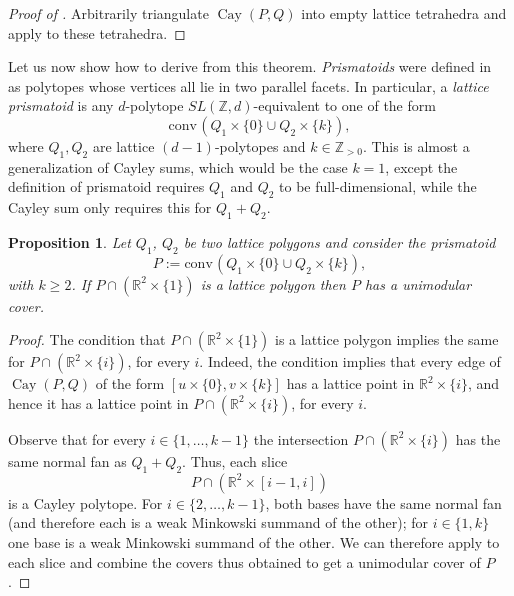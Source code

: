 \documentclass{amsart}
\theoremstyle{plain}
\newtheorem{proposition}[theorem]{Proposition}
\theoremstyle{definition}
\newcommand{\Z}{ \ensuremath{\mathbb{Z}}}
\newcommand{\R}{ \ensuremath{\mathbb{R}}}
\newcommand{\conv}{\ensuremath{\mathrm{conv}}\hspace{1pt}}
\newcommand{\cayley}{\operatorname{Cay}}
\begin{document}
\begin{proof}[Proof of ]
Arbitrarily triangulate $\cayley(P,Q)$ into empty lattice tetrahedra and apply  to these tetrahedra.
\end{proof}

Let us now show how to derive  from this theorem.
\emph{Prismatoids} were defined in~\cite{Santos-hirsch} as polytopes whose vertices all lie in two parallel facets. In particular, a \emph{lattice prismatoid} is any $d$-polytope $SL(\Z,d)$-equivalent to one of the form
\[
\conv(Q_1\times\{0\} \cup Q_2 \times \{k\}),
\]
where $Q_1,Q_2$ are lattice $(d-1)$-polytopes and $k\in \Z_{>0}$. This is almost a generalization of Cayley sums, which would be the case $k=1$, except the definition of prismatoid requires $Q_1$ and $Q_2$ to be full-dimensional, while the Cayley sum only requires this for $Q_1+Q_2$.

\begin{proposition}
\label{prop:prismatoid}
Let $Q_1$, $Q_2$ be two lattice polygons and consider the prismatoid 
\[
P:= \conv(Q_1\times\{0\} \cup Q_2 \times \{k\}),
\]
with $k\ge 2$. 
If $P\cap(\R^2\times\{1\})$ is a lattice polygon then $P$ has a unimodular cover.
\end{proposition}

\begin{proof}
The condition that $P\cap(\R^2\times\{1\})$ is a lattice polygon implies the same for $P\cap(\R^2\times\{i\})$, for every $i$. 
Indeed, the condition implies that every edge of $\cayley(P,Q)$ of the form $[u\times \{0\}, v\times \{k\}]$ has a lattice point in $\R^2\times\{i\}$, and hence it has a lattice point in $P\cap(\R^2\times\{i\})$, for every $i$.

Observe that for every $i\in \{1,\dots,k-1\}$ the intersection $P\cap(\R^2\times\{i\})$ has the same normal fan as $Q_1+Q_2$. Thus, each slice
\[
P \cap (\R^2\times[i-1,i])
\]
is a Cayley polytope. For $i\in\{2,\dots,k-1\}$,  both bases have the same normal fan (and therefore each is a weak Minkowski summand of the other); for $i\in \{1,k\}$ one base is a weak Minkowski summand of the other. We can therefore apply  to each slice and combine the covers thus obtained to get a unimodular cover of $P$.
\end{proof}
\end{document}
